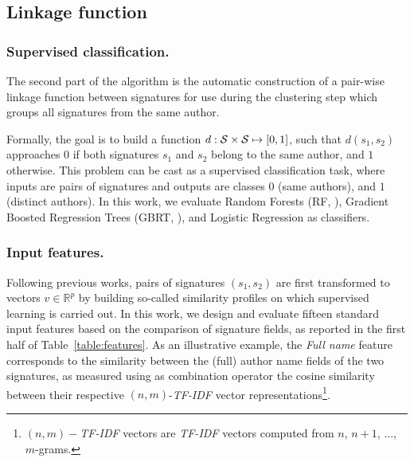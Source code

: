 \documentclass[runningheads,a4paper]{llncs}
\makeatletter
\newcommand*{\eg}{e.g.\@\xspace}
\makeatother
\begin{document}
\subsection{Linkage function}
\label{methods:linkage}


\subsubsection{Supervised classification.} The second part of the algorithm is the
automatic construction of a pair-wise linkage function between signatures for use
during the clustering step which groups all signatures from the same author.

Formally, the goal is to build a function $d: {\cal S} \times {\cal S} \mapsto
[0, 1]$, such that $d(s_1, s_2)$ approaches $0$ if both signatures $s_1$ and
$s_2$ belong to the same author, and $1$ otherwise.
This problem can be cast as a supervised classification task, where inputs
are pairs of signatures and outputs are classes $0$ (same authors), and $1$
(distinct authors). In this work, we evaluate Random Forests (RF, \cite{breiman2001random}),
Gradient Boosted Regression Trees (GBRT, \cite{friedman2001greedy}),
and Logistic Regression \cite{fan2008liblinear} as classifiers.



\subsubsection{Input features.} Following previous works, pairs of signatures $(s_1, s_2)$ are first transformed to vectors $v \in \mathbb{R}^p$
by building so-called similarity profiles \cite{treeratpituk2009disambiguating} on which supervised learning is carried out.
In this work, we design and evaluate fifteen standard input
features \cite{ferreira2012brief, levin2012citation} based on the comparison of signature fields, as reported in the first
half of Table~\ref{table:features}.
As an illustrative example, the \textit{Full name} feature corresponds to the similarity between the (full)
author name fields of the two signatures, as measured using as combination
operator the cosine similarity between their respective $(n,m)$-\emph{TF-IDF} vector
representations\footnote{$(n,m)-$\emph{TF-IDF} vectors are \emph{TF-IDF} vectors computed
from $n$, $n+1$, ..., $m$-grams.}.
\end{document}
